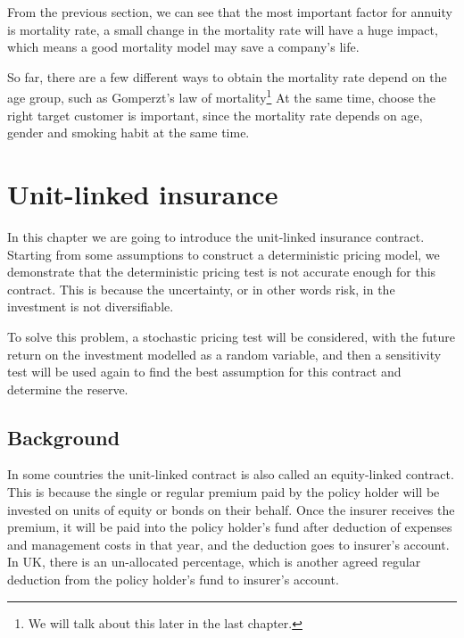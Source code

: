\documentclass{report}
\begin{document}
From the previous section, we can see that the most important factor for annuity is mortality rate, a small change in the mortality rate will have a huge impact, which means a good mortality model may save a company's life. 

So far, there are a few different ways to obtain the mortality rate depend on the age group, such as Gomperzt's law of mortality\footnote{We will talk about this later in the last chapter.} At the same time, choose the right target customer is important, since the mortality rate depends on age, gender and smoking habit at the same time.









\chapter{Unit-linked insurance}     \label{unit-linked}



In this chapter we are going to introduce the unit-linked insurance contract. Starting from some assumptions to construct a deterministic pricing model, we demonstrate that the deterministic pricing test is not accurate enough for this contract.
This is because the uncertainty, or in other words risk, in the investment is not diversifiable.  

To solve this problem, a stochastic pricing test will be considered, with the future return on the investment modelled as a random variable, and then a sensitivity test will be used again to find the best assumption for this contract and determine the reserve. 


\section{Background}

In some countries the unit-linked contract is also called an equity-linked contract. This is because the single or regular premium paid by the policy holder will be invested on units of equity or bonds on their behalf. Once the insurer receives the premium, it will be paid into the policy holder's fund after deduction of expenses and management costs in that year, and the deduction goes to insurer's account. In UK, there is an un-allocated percentage, which is another agreed regular deduction from the policy holder's fund to insurer's account.
\end{document}
